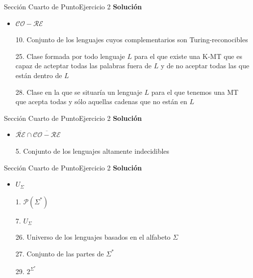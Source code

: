 \documentclass[10pt, envcountsect, presentation, aspectratio=169]{beamer}
\begin{document}

\begin{frame}{Sección Cuarto de Punto}{Ejercicio 2}
    \textbf{Solución}\\
    \begin{itemize}
        \item $\mathcal{CO-RE}$
        \item[10.] Conjunto de los lenguajes cuyos complementarios son Turing-reconocibles 
        \item[25.] Clase formada por todo lenguaje $L$ para el que existe una K-MT que es capaz de acteptar todas las palabras fuera de $L$ y de no aceptar todas las que están dentro de $L$
        \item[28.] Clase en la que se situaría un lenguaje $L$ para el que tenemos una MT que acepta todas y sólo aquellas cadenas que no están en $L$
    \end{itemize}
\end{frame}


\begin{frame}{Sección Cuarto de Punto}{Ejercicio 2}
    \textbf{Solución}\\
    \begin{itemize}
        \item $\overline{\mathcal{RE}} \cap \overline{\mathcal{CO-RE}}$
        \item[5.] Conjunto de los lenguajes altamente indecidibles
    \end{itemize}
\end{frame}


\begin{frame}{Sección Cuarto de Punto}{Ejercicio 2}
    \textbf{Solución}\\
    \begin{itemize}
        \item $U_\Sigma$
        \item[1.] $\mathcal{P}(\Sigma^*)$
        \item[7.] $U_\Sigma$
        \item[26.] Universo de los lenguajes basados en el alfabeto $\Sigma$
        \item[27.] Conjunto de las partes de $\Sigma^*$
        \item[29.] $2^{\Sigma^*}$
    \end{itemize}
\end{frame}
\end{document}
